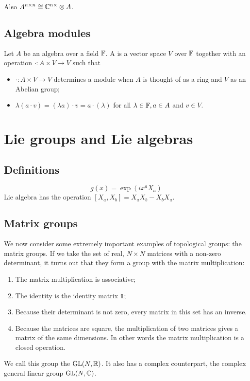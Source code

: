 Also $A^{n\times n} \cong \mathbb{C}^{n\times }\otimes A$.

\section{Algebra modules}
\begin{definition}
Let $A$ be an algebra over a field $\mathbb{F}$. A  is a vector space $V$ over $\mathbb{F}$ together with an operation $\cdot: A\times V \to V$ such that
\begin{itemize}
\item $\cdot: A\times V \to V$ determines a module when $A$ is thought of as a ring and $V$ as an Abelian group;
\item $\lambda(a\cdot v) = (\lambda a)\cdot v = a\cdot (\lambda)$ for all $\lambda\in \mathbb{F}, a\in A$ and $v\in V$.
\end{itemize}
\end{definition}

\chapter{Lie groups and Lie algebras}
\section{Definitions}
\[ g(x) = \exp(ix^aX_a) \]
Lie algebra has the operation $[X_a,X_b]= X_aX_b - X_bX_a$. 
\section{Matrix groups}
We now consider some extremely important examples of topological groups: the matrix groups.
If we take the set of real, $N\times N$ matrices with a non-zero determinant, it turns out that they form a group with the matrix multiplication:
\begin{enumerate}
\item The matrix multiplication is associative;
\item The identity is the identity matrix $\mathbb{1}$;
\item Because their determinant is not zero, every matrix in this set has an inverse.
\item Because the matrices are square, the multiplication of two matrices gives a matrix of the same dimensions. In other words the matrix multiplication is a closed operation.
\end{enumerate}
We call this group the  $\operatorname{GL}(N, \mathbb{R})$. It also has a complex counterpart, the complex general linear group $\operatorname{GL}(N, \mathbb{C})$.

